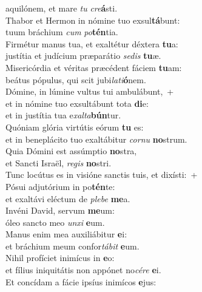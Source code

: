 \evenverse aquilónem, et mare \textit{tu} \textit{cre}\textbf{á}sti.\\
\oddverse Thabor et Hermon in nómine tuo exsul\textbf{tá}bunt:~\*\\
\oddverse tuum bráchium \textit{cum} \textit{po}\textbf{tén}tia.\\
\evenverse Firmétur manus tua, et exaltétur déxtera \textbf{tu}a:~\*\\
\evenverse justítia et judícium præparátio \textit{se}\textit{dis} \textbf{tu}æ.\\
\oddverse Misericórdia et véritas præcédent fáciem \textbf{tu}am:~\*\\
\oddverse beátus pópulus, qui scit jubi\textit{la}\textit{ti}\textbf{ó}nem.\\
\evenverse Dómine, in lúmine vultus tui ambulábunt,~+\\
\evenverse  et in nómine tuo exsultábunt tota \textbf{di}e:~\*\\
\evenverse et in justítia tua e\textit{xal}\textit{ta}\textbf{bún}tur.\\
\oddverse Quóniam glória virtútis eórum \textbf{tu} es:~\*\\
\oddverse et in beneplácito tuo exaltábitur \textit{cor}\textit{nu} \textbf{no}strum.\\
\evenverse Quia Dómini est assúmptio \textbf{no}stra,~\*\\
\evenverse et Sancti Israël, \textit{re}\textit{gis} \textbf{no}stri.\\
\oddverse Tunc locútus es in visióne sanctis tuis, et dixísti:~+\\
\oddverse  Pósui adjutórium in po\textbf{tén}te:~\*\\
\oddverse et exaltávi eléctum de \textit{ple}\textit{be} \textbf{me}a.\\
\evenverse Invéni David, servum \textbf{me}um:~\*\\
\evenverse óleo sancto meo \textit{un}\textit{xi} \textbf{e}um.\\
\oddverse Manus enim mea auxiliábitur \textbf{e}i:~\*\\
\oddverse et bráchium meum confor\textit{tá}\textit{bit} \textbf{e}um.\\
\evenverse Nihil profíciet inimícus in \textbf{e}o:~\*\\
\evenverse et fílius iniquitátis non appónet no\textit{cé}\textit{re} \textbf{e}i.\\
\oddverse Et concídam a fácie ipsíus inimícos \textbf{e}jus:~\*\\
